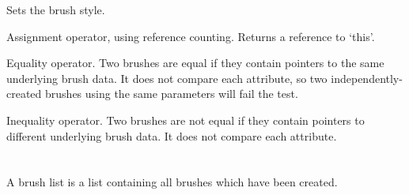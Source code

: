 \label{wxbrushsetstyle}


Sets the brush style.




\label{wxbrushassignment}


Assignment operator, using reference counting. Returns a reference
to `this'.

\label{wxbrushequals}


Equality operator. Two brushes are equal if they contain pointers
to the same underlying brush data. It does not compare each attribute,
so two independently-created brushes using the same parameters will
fail the test.

\label{wxbrushnotequals}


Inequality operator. Two brushes are not equal if they contain pointers
to different underlying brush data. It does not compare each attribute.

\section{}\label{wxbrushlist}

A brush list is a list containing all brushes which have been created.

